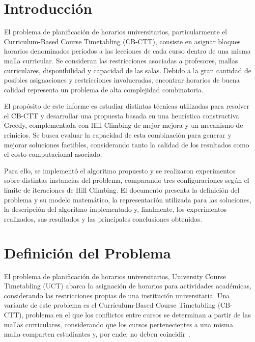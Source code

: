 \documentclass[letter, 10pt]{article}
\begin{document}
\section{Introducci\'on}
El problema de planificaci\'on de horarios universitarios, particularmente el Curriculum-Based Course Timetabling (CB-CTT), consiste en asignar bloques horarios denominados per\'iodos a las lecciones de cada curso dentro de una misma malla curricular. Se consideran las restricciones asociadas a profesores, mallas curriculares, disponibilidad y capacidad de las salas. Debido a la gran cantidad de posibles asignaciones y restricciones involucradas, encontrar horarios de buena calidad representa un problema de alta complejidad combinatoria.

El prop\'osito de este informe es estudiar distintas t\'ecnicas utilizadas para resolver el CB-CTT y desarrollar una propuesta basada en una heur\'istica constructiva Greedy, complementada con Hill Climbing de mejor mejora y un mecanismo de reinicios. Se busca evaluar la capacidad de esta combinaci\'on para generar y mejorar soluciones factibles, considerando tanto la calidad de los resultados como el costo computacional asociado.

Para ello, se implement\'o el algoritmo propuesto y se realizaron experimentos sobre distintas instancias del problema, comparando tres configuraciones seg\'un el l\'imite de iteraciones de Hill Climbing. El documento presenta la definici\'on del problema y su modelo matem\'atico, la representaci\'on utilizada para las soluciones, la descripci\'on del algoritmo implementado y, finalmente, los experimentos realizados, sus resultados y las principales conclusiones obtenidas.
\section{Definici\'on del Problema}
El problema de planificaci\'on de horarios universitarios, University Course Timetabling (UCT)  abarca la asignaci\'on de horarios para actividades acad\'emicas, considerando las restricciones propias de una instituci\'on universitaria. Una variante de este problema es el Curr\'iculum-Based Course Timetabling (CB-CTT), problema en el que los conflictos entre cursos se determinan a partir de las mallas curriculares, considerando que los cursos pertenecientes a una misma malla comparten estudiantes y, por ende, no deben coincidir~\cite{DiGaspero2007ITC}.
\end{document}
